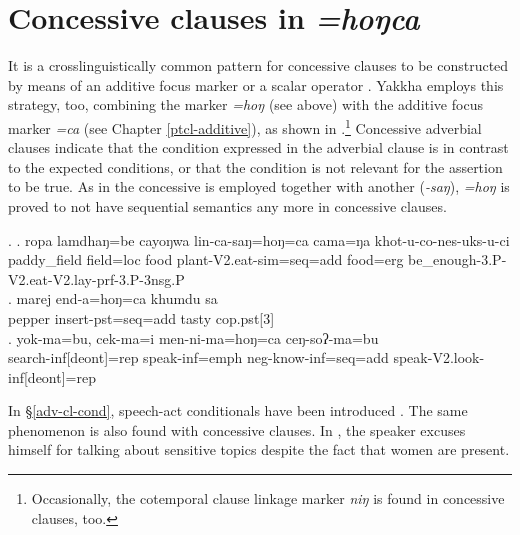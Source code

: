 \section{Concessive clauses in \emph{=hoŋca}}\label{adv-cl-conc}

It is a crosslinguistically common pattern for concessive clauses to be constructed by means of an additive focus marker or a scalar operator \citep[980]{Koenig1993_Focus}. Yakkha employs this strategy, too, combining the  marker  \emph{=hoŋ} (see above) with the additive focus marker \emph{=ca} (see Chapter \ref{ptcl-additive}), as shown in \Next.\footnote{Occasionally, the  cotemporal clause linkage marker \emph{niŋ} is found in concessive clauses, too.} Concessive adverbial clauses indicate that the condition expressed in the adverbial clause is in contrast to the expected conditions, or that the condition is not relevant for the assertion to be true. As in \Next[a] the concessive is employed together with another  (\emph{-saŋ}),  \emph{=hoŋ} is proved to not have sequential semantics any more in concessive clauses.

\ex. \ag. ropa  lamdhaŋ=be    cayoŋwa  lin-ca-saŋ=hoŋ=ca                       cama=ŋa   khot-u-co-nes-uks-u-ci\\
paddy\_field field{\sc =loc} food plant{\sc -V2.eat-sim=seq=add} food{\sc =erg} be\_enough{\sc -3.P-V2.eat-V2.lay-prf-3.P-3nsg.P}\\
 
\bg. marej end-a=hoŋ=ca khumdu sa\\
 pepper insert{\sc [3sg]-pst=seq=add} tasty {\sc cop.pst[3]}\\
 \bg. yok-ma=bu, cek-ma=i men-ni-ma=hoŋ=ca ceŋ-soʔ-ma=bu\\
 search{\sc -inf[deont]=rep} speak{\sc -inf=emph} {\sc neg-}know{\sc -inf=seq=add} speak{\sc -V2.look-inf[deont]=rep}\\
 
 In §\ref{adv-cl-cond}, speech-act conditionals have been introduced \citep{Thompsonetal2007_Adverbial}. The same phenomenon is also found with concessive clauses. In \Next, the speaker excuses himself for talking about sensitive topics despite the fact that women are present. 
 
